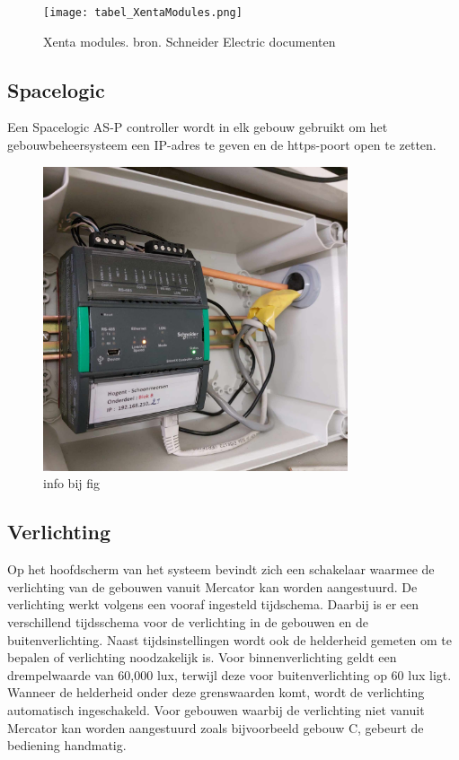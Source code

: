 \begin{figure}
  \centering
  \texttt{[image: tabel\_XentaModules.png]}
  \caption[Xenta modules. bron. Schneider Electric documenten]{\label{fig:xentamodules}Xenta modules. bron. Schneider Electric documenten}
\end{figure}

\subsection{Spacelogic}
Een Spacelogic AS-P controller wordt in elk gebouw gebruikt om het gebouwbeheersysteem een IP-adres te geven en de https-poort open te zetten.

\begin{figure}
    
    \includegraphics[width=0.8\textwidth]{../graphics/AS-P.jpg}
    \caption[asp]{\label{fig:asp}info bij fig}
\end{figure}

\subsection{Verlichting}
Op het hoofdscherm van het systeem bevindt zich een schakelaar waarmee de verlichting van de gebouwen vanuit Mercator kan worden aangestuurd. De verlichting werkt volgens een vooraf ingesteld tijdschema. Daarbij is er een verschillend tijdsschema voor de verlichting in de gebouwen en de buitenverlichting. \newline \newline
Naast tijdsinstellingen wordt ook de helderheid gemeten om te bepalen of verlichting noodzakelijk is. Voor binnenverlichting geldt een drempelwaarde van 60,000 lux, terwijl deze voor buitenverlichting op 60 lux ligt. Wanneer de helderheid onder deze grenswaarden komt, wordt de verlichting automatisch ingeschakeld. Voor gebouwen waarbij de verlichting niet vanuit Mercator kan worden aangestuurd zoals bijvoorbeeld gebouw C, gebeurt de bediening handmatig.


